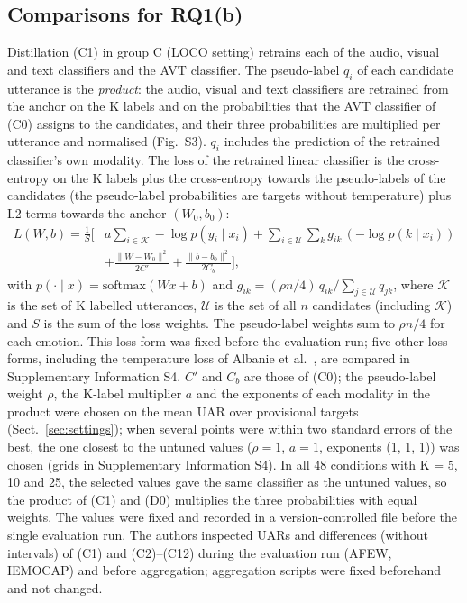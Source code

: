 \subsection{Comparisons for RQ1(b)}\label{sec:rq1b-compare}
Distillation (C1) in group C (LOCO setting) retrains each of the audio, visual and text classifiers and the AVT classifier. The pseudo-label $q_i$ of each candidate utterance is the \emph{product}: the audio, visual and text classifiers are retrained from the anchor on the K labels and on the probabilities that the AVT classifier of (C0) assigns to the candidates, and their three probabilities are multiplied per utterance and normalised (Fig.~S3). $q_i$ includes the prediction of the retrained classifier's own modality. The loss of the retrained linear classifier is the cross-entropy on the K labels plus the cross-entropy towards the pseudo-labels of the candidates (the pseudo-label probabilities are targets without temperature) plus L2 terms towards the anchor $(W_0,b_0)$:
\begin{equation}
\begin{split}
L(W,b)=\frac{1}{S}\Big[&a\sum_{i\in\mathcal{K}}-\log p(y_i\mid x_i)+\sum_{i\in\mathcal{U}}\sum_k g_{ik}\,(-\log p(k\mid x_i))\\
&+\frac{\|W-W_0\|^2}{2C'}+\frac{\|b-b_0\|^2}{2C_b}\Big],
\end{split}
\end{equation}
with $p(\cdot\mid x)=\mathrm{softmax}(Wx+b)$ and $g_{ik}=(\rho n/4)\,q_{ik}/\sum_{j\in\mathcal{U}}q_{jk}$, where $\mathcal{K}$ is the set of K labelled utterances, $\mathcal{U}$ is the set of all $n$ candidates (including $\mathcal{K}$) and $S$ is the sum of the loss weights. The pseudo-label weights sum to $\rho n/4$ for each emotion. This loss form was fixed before the evaluation run; five other loss forms, including the temperature loss of Albanie et al.\ \cite{hinton2015distilling,albanie2018}, are compared in Supplementary Information S4. $C'$ and $C_b$ are those of (C0); the pseudo-label weight $\rho$, the K-label multiplier $a$ and the exponents of each modality in the product were chosen on the mean UAR over provisional targets (Sect.~\ref{sec:settings}); when several points were within two standard errors of the best, the one closest to the untuned values ($\rho=1$, $a=1$, exponents (1, 1, 1)) was chosen (grids in Supplementary Information S4). In all 48 conditions with K = 5, 10 and 25, the selected values gave the same classifier as the untuned values, so the product of (C1) and (D0) multiplies the three probabilities with equal weights. The values were fixed and recorded in a version-controlled file before the single evaluation run. The authors inspected UARs and differences (without intervals) of (C1) and (C2)--(C12) during the evaluation run (AFEW, IEMOCAP) and before aggregation; aggregation scripts were fixed beforehand and not changed.

